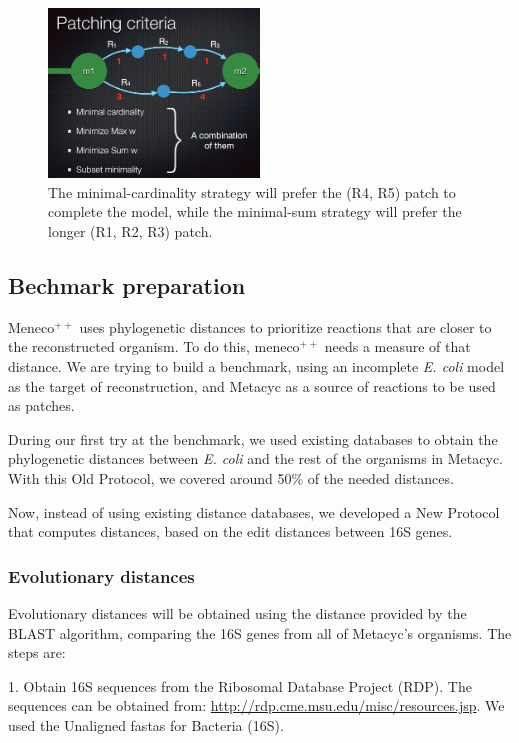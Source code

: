\documentclass{article}
\newcommand{\Meneco}{Meneco$^{++}$\xspace}
\newcommand{\meneco}{meneco$^{++}$\xspace}
\begin{document}
\begin{figure}[tb]
	\begin{center}
		\includegraphics[width=0.5\textwidth]{figs/patchingStrategies.png}
	\end{center}
	\caption[]{The minimal-cardinality strategy will prefer the (R4, R5) patch to complete the model, while the minimal-sum strategy will prefer the longer (R1, R2, R3) patch.}
	\label{fig:strategies}
\end{figure}


\subsection{Bechmark preparation}

\Meneco uses phylogenetic distances to prioritize reactions that are closer to the reconstructed organism. To do this, \meneco needs a measure of that distance. We are trying to build a benchmark, using an incomplete \emph{E. coli} model as the target of reconstruction, and Metacyc as a source of reactions to be used as patches.

During our first try at the benchmark, we used existing databases to obtain the phylogenetic distances between \emph{E. coli} and the rest of the organisms in Metacyc. With this Old Protocol, we covered around 50\% of the needed distances.

Now, instead of using existing distance databases, we developed a New Protocol that computes distances, based on the edit distances between 16S genes.


\subsubsection{Evolutionary distances}

Evolutionary distances will be obtained using the distance provided by the BLAST algorithm, comparing the 16S genes from all of Metacyc's organisms. The steps are:

1. Obtain 16S sequences from the Ribosomal Database Project (RDP). The sequences can be obtained from: \url{http://rdp.cme.msu.edu/misc/resources.jsp}. We used the Unaligned fastas for Bacteria (16S).
\end{document}
